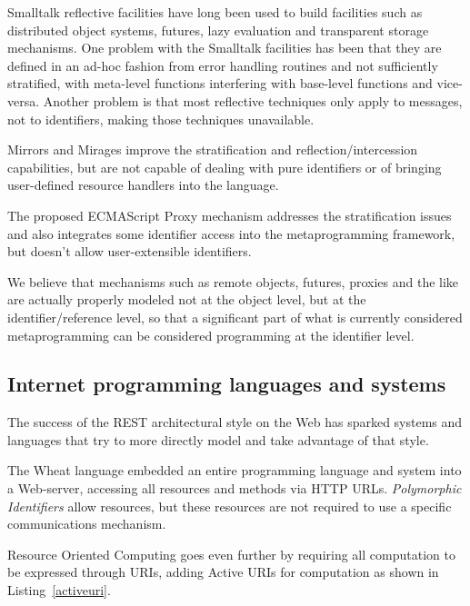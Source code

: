 \documentclass[preprint,authoryear]{llncs}
\begin{document}
Smalltalk reflective facilities \cite{reflective-st} have long been used to build
facilities such as distributed object systems, futures, lazy evaluation and
transparent storage mechanisms.  One problem with the Smalltalk facilities
has been that they are defined in an ad-hoc fashion from error handling routines
and not sufficiently stratified, with meta-level functions
interfering with base-level functions and vice-versa.  Another problem is that
most reflective techniques only apply to messages, not to identifiers, making 
those techniques unavailable.

Mirrors \cite{mirrors} and Mirages \cite{mirages} improve the stratification and
reflection/intercession capabilities, but are not capable of dealing with pure
identifiers or of bringing user-defined resource handlers into the language.

The proposed ECMAScript Proxy mechanism \cite{VanCutsemMiller} addresses
the stratification issues and also integrates some identifier access into the 
metaprogramming framework, but doesn't allow user-extensible identifiers.

We believe that mechanisms such as remote objects, futures, proxies and the like
are actually properly modeled not at the object level, but at the identifier/reference
level, so that a significant part of what is currently considered metaprogramming
can be considered programming at the identifier level.

\subsection{Internet programming languages and systems}

The success of the REST architectural style\cite{fielding-rest} on the Web has sparked
systems and languages that try to more directly model and take advantage of that
style.

The Wheat language \cite{wheat} embedded an entire programming language
and system into a Web-server, accessing all resources and methods via
HTTP URLs.  \emph{Polymorphic Identifiers} allow resources, but these resources
are not required to use a specific communications mechanism.


Resource Oriented Computing \cite{roc} goes even further by
requiring all computation to be expressed through URIs, adding Active URIs
for computation as shown in Listing~\ref{activeuri}.   


\end{document}
